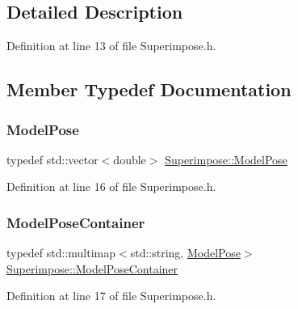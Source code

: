 \subsection{Detailed Description}


Definition at line 13 of file Superimpose.\+h.



\subsection{Member Typedef Documentation}
\mbox{\label{classSuperimpose_a85d40a5caf19f486d1e0c15c0a025378}} 
\subsubsection{\texorpdfstring{Model\+Pose}{ModelPose}}
{\footnotesize\ttfamily typedef std\+::vector$<$double$>$ \mbox{\hyperlink{classSuperimpose_a85d40a5caf19f486d1e0c15c0a025378}{Superimpose\+::\+Model\+Pose}}}



Definition at line 16 of file Superimpose.\+h.

\mbox{\label{classSuperimpose_a178e3d4e2def6635bfcf9454dd4b5d22}} 
\subsubsection{\texorpdfstring{Model\+Pose\+Container}{ModelPoseContainer}}
{\footnotesize\ttfamily typedef std\+::multimap$<$std\+::string, \mbox{\hyperlink{classSuperimpose_a85d40a5caf19f486d1e0c15c0a025378}{Model\+Pose}}$>$ \mbox{\hyperlink{classSuperimpose_a178e3d4e2def6635bfcf9454dd4b5d22}{Superimpose\+::\+Model\+Pose\+Container}}}



Definition at line 17 of file Superimpose.\+h.

\mbox{\label{classSuperimpose_a1e02e0225687b42296dcfee4eadf8a55}} 
